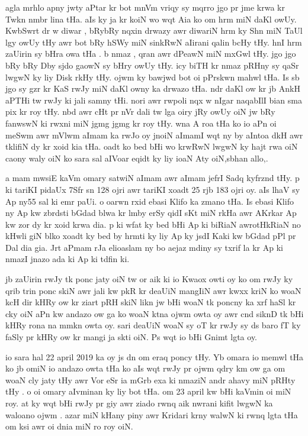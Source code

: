 \documentclass[a4paper]{article}
\begin{document}
agla mrhlo apny jwty aPtar kr bot mnVm vriqy sy mqrro jgo pr jme krwa kr Twkn nmbr lina tHa.
aIs ky ja kr koiN wo wqt Aia ko om hrm miN daKl owUy.
KwbSwrt dr  w   diwar , bRybRy  nqxin drwazy awr diwariN hrm ky Shn miN TaUl lgy  owUy tHy awr bot bRy hSWy miN sinkRwN aIirani qalin bcHy tHy.
hnI hrm zaUirin  sy bHra owa tHa .
b nmaz  , qran awr dPeawN miN mxGwl tHy.
jgo jgo bRy bRy Dby sjdo gaowN sy bHry owUy tHy.
icy biTH kr nmaz  pRHny sy qaSr lwgwN ky liy Disk rkHy tHy.
ojwm ky bawjwd bot oi pPrskwn mahwl tHa.
Is sb jgo sy gzr kr KaS rwJy miN daKl owny ka drwazo tHa.
ndr daKl ow kr jb AnkH aPTHi tw rwJy ki jali samny tHi.
nori awr rwpoli nqx  w  nIgar naqabIlI bian sma pix kr roy tHy.
nbd awr cHt pr nVr dali tw lga oiry jRy owUy oiN jw bRy fanwswN ki rwxni miN jgmg jgmg kr roy tHy.
wna A roa tHa ko io aPn oi meSwm awr mVlwm aImam ka rwJo oy jnoiN aImamI wqt ny by aIntoa dkH awr tklifiN dy kr xoid kia tHa.
oadt ko bed bHi wo krwRwN lwgwN ky hajt rwa oiN caony waly oiN ko sara sal aIVoar eqidt ky liy ioaN Aty oiN,sbhan allo,.

a mam mwsiE kaVm omary satwiN aImam awr aImam jefrI Sadq kyfrznd tHy.
p ki tariKI pidaUx  7Sfr sn 128 ojri  awr tariKI xoadt 25 rjb 183 ojri oy.
aIs lhaV sy Ap ny55 sal ki emr paUi.
o oarwn rxid ebasi Klifo ka zmano tHa.
Is ebasi Klifo ny Ap kw zbrdsti bGdad blwa kr  lmby erSy qidI sKt miN rkHa awr AKrkar Ap kw zor dy kr xoid krwa dia.
p ki wfat ky bed bHi Ap ki biRiaN awrotHkRiaN no kHwli giN blko xoadt ky bed by hrmti ky liy Ap ky jsdI Kaki kw bGdad pPl pr Dal dia gia.
Jrt aPmam rJa elioaslam ny bo aejaz mdiny sy txrif la kr Ap ki nmazI jnazo ada ki Ap ki tdfin ki.

jb zaUirin rwJy tk ponc jaty oiN tw or aik ki io Kwaox owti oy ko om rwJy ky qrib trin ponc skiN awr jali kw pkR kr deaUiN mangIiN awr kwxx kriN ko woaN kcH dir kHRy ow kr ziart pRH  skiN likn jw bHi woaN tk poncny ka xrf haSl kr cky oiN aPn kw andazo  ow ga ko woaN ktna ojwm owta oy awr cnd siknD tk bHi kHRy rona na mmkn owta oy.
sari deaUiN woaN sy oT kr  rwJy sy ds baro fT ky faSly pr kHRy ow kr mangi ja skti oiN.
Ps wqt io bHi Gnimt lgta oy.

io sara hal 22 april 2019 ka oy js dn om eraq poncy tHy.
Yb omara io memwl tHa ko jb omiN io andazo owta tHa ko aIs wqt rwJy pr ojwm qdry km ow ga om woaN cly jaty tHy awr Vor eSr ia mGrb exa ki nmaziN  andr ahavy miN pRHty tHy .
o oi omary aIvminan ky liy bot tHa.
om 23 april kw bHi kaVmin oi miN roy.
at ky wqt bHi rwJy pr giy awr ziado rwnq aik nwrani kifit lwgwN ka waloano ojwm .
azar miN kHany piny awr Kridari krny walwN ki rwnq lgta tHa om ksi awr oi dnia miN ro roy oiN.
\end{document}
